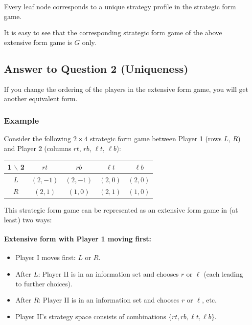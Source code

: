 \documentclass[12pt, a4paper]{article}
\begin{document}
\begin{notebox}
Every leaf node corresponds to a unique strategy profile in the strategic form game.
\end{notebox}

\medskip
It is easy to see that the corresponding strategic form game of the above extensive form game is $G$ only.

\subsection{Answer to Question 2 (Uniqueness)}

If you change the ordering of the players in the extensive form game, you will get another equivalent form.

\subsubsection*{Example}

Consider the following $2 \times 4$ strategic form game between Player 1 (rows $L$, $R$) and Player 2 (columns $rt$, $rb$, $\ell t$, $\ell b$):

\begin{center}
\begin{tabular}{c|cccc}
  1 $\backslash$ 2 & $rt$ & $rb$ & $\ell t$ & $\ell b$ \\\hline
  $L$ & $(2,-1)$ & $(2,-1)$ & $(2,0)$ & $(2,0)$ \\
  $R$ & $(2,1)$  & $(1,0)$  & $(2,1)$ & $(1,0)$ \\
\end{tabular}
\end{center}

This strategic form game can be represented as an extensive form game in (at least) two ways:

\paragraph{Extensive form with Player 1 moving first:}
\begin{itemize}
  \item Player I moves first: $L$ or $R$.
  \item After $L$: Player II is in an information set and chooses $r$ or $\ell$ (each leading to further choices).
  \item After $R$: Player II is in an information set and chooses $r$ or $\ell$, etc.
  \item Player II's strategy space consists of combinations $\{rt, rb, \ell t, \ell b\}$.
\end{itemize}
\end{document}
